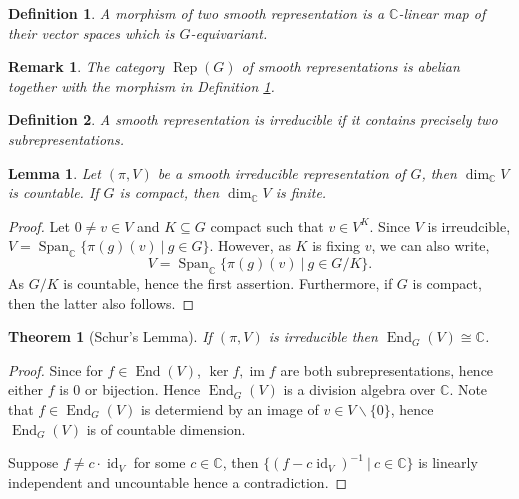 \documentclass[10pt]{article}
\newtheorem{theorem}{Theorem} [section]
\newtheorem{definition}{Definition}[section]
\newtheorem{lemma}{Lemma}[section]
\newtheorem{remark}{Remark}[section]
\numberwithin{equation}{theorem}
\DeclareMathOperator{\End}{End}
\DeclareMathOperator{\Rep}{Rep}
\DeclareMathOperator{\image}{im}
\DeclareMathOperator{\Span}{Span}
\DeclareMathOperator{\id}{id}
\newcommand{\C}[0]{\mathbb{C}}
\newcommand{\sep}[0]{\:|\:}
\begin{document}
\begin{definition}
    \label{definition_3_2}
    A morphism of two smooth representation is a $\C$-linear map of their vector spaces which is $G$-equivariant.
\end{definition}

\begin{remark}
    The category $\Rep(G)$ of smooth representations is abelian together with the morphism in Definition \ref{definition_3_2}.
\end{remark}

\begin{definition}
    \label{definition_3_3}
    A smooth representation is irreducible if it contains precisely two subrepresentations.
\end{definition}

\begin{lemma}
    \label{lemma_3_1}
    Let $(\pi,V)$ be a smooth irreducible representation of $G$, then $\dim_\C V$ is countable. If $G$ is compact, then $\dim_\C V$ is finite. 
\end{lemma}

\begin{proof}
    Let $0\not=v\in V$ and $K\subseteq G$ compact such that $v\in V^K$. Since $V$ is irreudcible, $V = \Span_\C\{\pi(g)(v)\sep g\in G\}$. However, as $K$ is fixing $v$, we can also write,
    \begin{equation*}
        V = \Span_\C\{\pi(g)(v)\sep g\in G/K\}.
    \end{equation*}
    As $G/K$ is countable, hence the first assertion. Furthermore, if $G$ is compact, then the latter also follows.
\end{proof}

\begin{theorem}[Schur's Lemma]
    \label{theorem_3_1}
    If $(\pi,V)$ is irreducible then $\End_G(V)\cong \C$.
\end{theorem}

\begin{proof}
    Since for $f\in\End(V)$, $\ker f,\image f$ are both subrepresentations, hence either $f$ is $0$ or bijection. Hence $\End_G(V)$ is a division algebra over $\C$. Note that $f\in\End_G(V)$ is determiend by an image of $v\in V\backslash\{0\}$, hence $\End_G(V)$ is of countable dimension.
    \par Suppose $f\not=c\cdot\id_V$ for some $c\in \C$, then $\{(f-c\id_V)^{-1}\sep c\in\C\}$ is linearly independent and uncountable hence a contradiction.
\end{proof}
\end{document}
